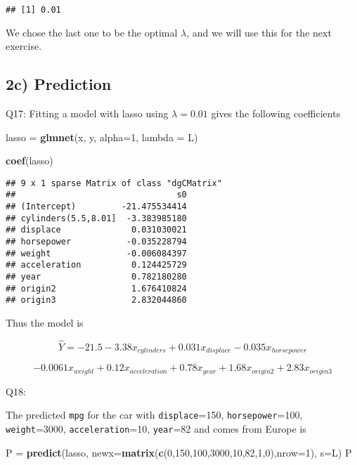 \documentclass[]{article}
\newenvironment{Shaded}{\begin{snugshade}}{\end{snugshade}}
\newcommand{\KeywordTok}[1]{\textcolor[rgb]{0.13,0.29,0.53}{\textbf{#1}}}
\newcommand{\DataTypeTok}[1]{\textcolor[rgb]{0.13,0.29,0.53}{#1}}
\newcommand{\DecValTok}[1]{\textcolor[rgb]{0.00,0.00,0.81}{#1}}
\newcommand{\StringTok}[1]{\textcolor[rgb]{0.31,0.60,0.02}{#1}}
\newcommand{\NormalTok}[1]{#1}
\begin{document}
\begin{verbatim}
## [1] 0.01
\end{verbatim}

We chose the last one to be the optimal \(\lambda\), and we will use
this for the next exercise.

\subsection{2c) Prediction}\label{c-prediction}

Q17: Fitting a model with lasso using \(\lambda = 0.01\) gives the
following coefficients

\begin{Shaded}
\begin{Highlighting}[]
\NormalTok{lasso =}\StringTok{ }\KeywordTok{glmnet}\NormalTok{(x, y, }\DataTypeTok{alpha=}\DecValTok{1}\NormalTok{, }\DataTypeTok{lambda =}\NormalTok{ L)}

\KeywordTok{coef}\NormalTok{(lasso)}
\end{Highlighting}
\end{Shaded}

\begin{verbatim}
## 9 x 1 sparse Matrix of class "dgCMatrix"
##                                s0
## (Intercept)         -21.475534414
## cylinders(5.5,8.01]  -3.383985180
## displace              0.031030021
## horsepower           -0.035228794
## weight               -0.006084397
## acceleration          0.124425729
## year                  0.782180280
## origin2               1.676410824
## origin3               2.832044860
\end{verbatim}

Thus the model is

\[
\hat{Y} = -21.5 -3.38x_{cylinders} + 0.031x_{displace} - 0.035x_{horsepower}
\]

\[
-0.0061x_{weight}+0.12x_{acceleration} +0.78x_{year}+1.68x_{origin2}+2.83x_{origin3}
\]

Q18:

The predicted \texttt{mpg} for the car with \texttt{displace}=150,
\texttt{horsepower}=100, \texttt{weight}=3000, \texttt{acceleration}=10,
\texttt{year}=82 and comes from Europe is

\begin{Shaded}
\begin{Highlighting}[]
\NormalTok{P =}\StringTok{ }\KeywordTok{predict}\NormalTok{(lasso, }\DataTypeTok{newx=}\KeywordTok{matrix}\NormalTok{(}\KeywordTok{c}\NormalTok{(}\DecValTok{0}\NormalTok{,}\DecValTok{150}\NormalTok{,}\DecValTok{100}\NormalTok{,}\DecValTok{3000}\NormalTok{,}\DecValTok{10}\NormalTok{,}\DecValTok{82}\NormalTok{,}\DecValTok{1}\NormalTok{,}\DecValTok{0}\NormalTok{),}\DataTypeTok{nrow=}\DecValTok{1}\NormalTok{), }\DataTypeTok{s=}\NormalTok{L)}
\NormalTok{P}
\end{Highlighting}
\end{Shaded}
\end{document}
